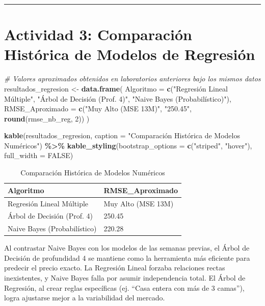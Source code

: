 \documentclass[
]{article}
\newenvironment{Shaded}{\begin{snugshade}}{\end{snugshade}}
\newcommand{\AttributeTok}[1]{\textcolor[rgb]{0.13,0.29,0.53}{#1}}
\newcommand{\CommentTok}[1]{\textcolor[rgb]{0.56,0.35,0.01}{\textit{#1}}}
\newcommand{\ConstantTok}[1]{\textcolor[rgb]{0.56,0.35,0.01}{#1}}
\newcommand{\DecValTok}[1]{\textcolor[rgb]{0.00,0.00,0.81}{#1}}
\newcommand{\FunctionTok}[1]{\textcolor[rgb]{0.13,0.29,0.53}{\textbf{#1}}}
\newcommand{\NormalTok}[1]{#1}
\newcommand{\OtherTok}[1]{\textcolor[rgb]{0.56,0.35,0.01}{#1}}
\newcommand{\SpecialCharTok}[1]{\textcolor[rgb]{0.81,0.36,0.00}{\textbf{#1}}}
\newcommand{\StringTok}[1]{\textcolor[rgb]{0.31,0.60,0.02}{#1}}
\begin{document}
\begin{center}\rule{0.5\linewidth}{0.5pt}\end{center}

\section{Actividad 3: Comparación Histórica de Modelos de
Regresión}\label{actividad-3-comparaciuxf3n-histuxf3rica-de-modelos-de-regresiuxf3n}

\begin{Shaded}
\begin{Highlighting}[]
\CommentTok{\# Valores aproximados obtenidos en laboratorios anteriores bajo los mismos datos}
\NormalTok{resultados\_regresion }\OtherTok{\textless{}{-}} \FunctionTok{data.frame}\NormalTok{(}
  \AttributeTok{Algoritmo =} \FunctionTok{c}\NormalTok{(}\StringTok{"Regresión Lineal Múltiple"}\NormalTok{, }\StringTok{"Árbol de Decisión (Prof. 4)"}\NormalTok{, }\StringTok{"Naive Bayes (Probabilístico)"}\NormalTok{),}
  \AttributeTok{RMSE\_Aproximado =} \FunctionTok{c}\NormalTok{(}\StringTok{"Muy Alto (MSE 13M)"}\NormalTok{, }\StringTok{"250.45"}\NormalTok{, }\FunctionTok{round}\NormalTok{(rmse\_nb\_reg, }\DecValTok{2}\NormalTok{))}
\NormalTok{)}

\FunctionTok{kable}\NormalTok{(resultados\_regresion, }\AttributeTok{caption =} \StringTok{"Comparación Histórica de Modelos Numéricos"}\NormalTok{) }\SpecialCharTok{\%\textgreater{}\%}
  \FunctionTok{kable\_styling}\NormalTok{(}\AttributeTok{bootstrap\_options =} \FunctionTok{c}\NormalTok{(}\StringTok{"striped"}\NormalTok{, }\StringTok{"hover"}\NormalTok{), }\AttributeTok{full\_width =} \ConstantTok{FALSE}\NormalTok{)}
\end{Highlighting}
\end{Shaded}

\begin{longtable}[t]{ll}
\caption{\label{tab:comparacion_regresion}Comparación Histórica de Modelos Numéricos}\\
\toprule
Algoritmo & RMSE\_Aproximado\\
\midrule
Regresión Lineal Múltiple & Muy Alto (MSE 13M)\\
Árbol de Decisión (Prof. 4) & 250.45\\
Naive Bayes (Probabilístico) & 220.28\\
\bottomrule
\end{longtable}

Al contrastar Naive Bayes con los modelos de las semanas previas, el
Árbol de Decisión de profundidad 4 se mantiene como la herramienta más
eficiente para predecir el precio exacto. La Regresión Lineal forzaba
relaciones rectas inexistentes, y Naive Bayes falla por asumir
independencia total. El Árbol de Regresión, al crear reglas específicas
(ej. ``Casa entera con más de 3 camas''), logra ajustarse mejor a la
variabilidad del mercado.
\end{document}
